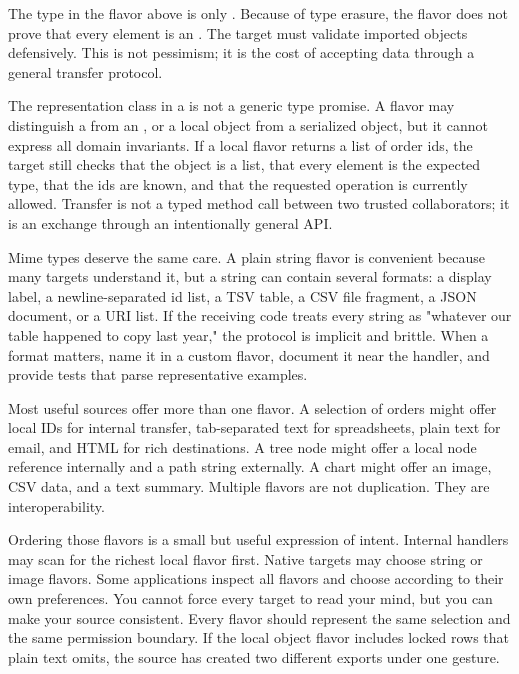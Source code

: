 The type in the flavor above is only . Because of type erasure, the flavor does not prove that every element is an . The target must validate imported objects defensively. This is not pessimism; it is the cost of accepting data through a general transfer protocol.

The representation class in a  is not a generic type promise. A flavor may distinguish a  from an , or a local object from a serialized object, but it cannot express all domain invariants. If a local flavor returns a list of order ids, the target still checks that the object is a list, that every element is the expected type, that the ids are known, and that the requested operation is currently allowed. Transfer is not a typed method call between two trusted collaborators; it is an exchange through an intentionally general API.

Mime types deserve the same care. A plain string flavor is convenient because many targets understand it, but a string can contain several formats: a display label, a newline-separated id list, a TSV table, a CSV file fragment, a JSON document, or a URI list. If the receiving code treats every string as "whatever our table happened to copy last year," the protocol is implicit and brittle. When a format matters, name it in a custom flavor, document it near the handler, and provide tests that parse representative examples.

Most useful sources offer more than one flavor. A selection of orders might offer local IDs for internal transfer, tab-separated text for spreadsheets, plain text for email, and HTML for rich destinations. A tree node might offer a local node reference internally and a path string externally. A chart might offer an image, CSV data, and a text summary. Multiple flavors are not duplication. They are interoperability.

Ordering those flavors is a small but useful expression of intent. Internal handlers may scan for the richest local flavor first. Native targets may choose string or image flavors. Some applications inspect all flavors and choose according to their own preferences. You cannot force every target to read your mind, but you can make your source consistent. Every flavor should represent the same selection and the same permission boundary. If the local object flavor includes locked rows that plain text omits, the source has created two different exports under one gesture.

